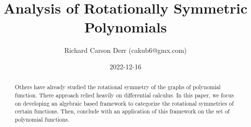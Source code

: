\documentclass{article}
\title{Analysis of Rotationally Symmetric Polynomials}
\author{Richard Carson Derr (cakub6@gmx.com)}
\date{2022-12-16}
\begin{document}
\maketitle

\begin{abstract}
  Others have already studied the rotational symmetry
  of the graphs of polynomial function. There approach
  relied heavily on differential calculus. In this paper,
  we focus on developing an algebraic based framework
  to categorize the rotational symmetries of certain
  functions. Then, conclude with an application of this
  framework on the set of polynomial functions.
\end{abstract}
\end{document}
